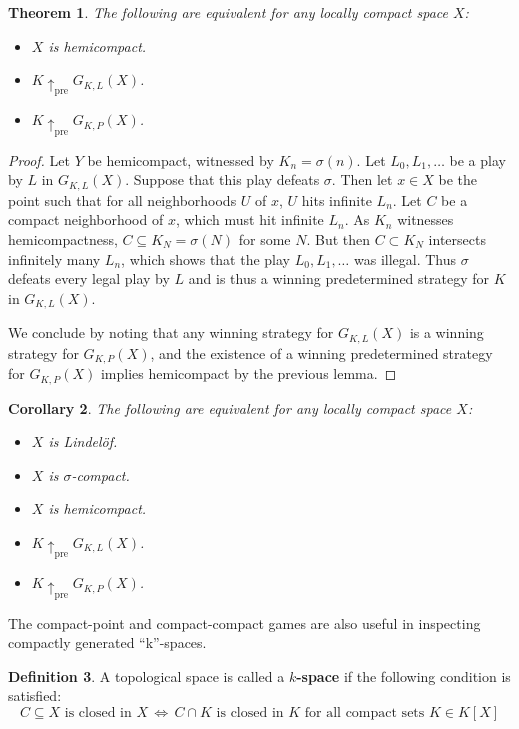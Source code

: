 \documentclass[11pt]{article}
\theoremstyle{plain}
\newtheorem{theorem}{Theorem}
\newtheorem{corollary}[theorem]{Corollary}
\theoremstyle{definition}
\newtheorem{definition}[theorem]{Definition}
\theoremstyle{remark}
\newcommand{\prewin}{\uparrow_{\text{pre}}}
\begin{document}
\begin{theorem}
The following are equivalent for any locally compact space $X$:
  \begin{itemize}
  \item $X$ is hemicompact.
  \item $K \prewin G_{K,L}(X)$.
  \item $K \prewin G_{K,P}(X)$.
  \end{itemize}
\end{theorem}

\begin{proof}
Let $Y$ be hemicompact, witnessed by $K_n=\sigma(n)$. Let $L_0,L_1,\dots$ be a play by $L$ in $G_{K,L}(X)$. Suppose that this play defeats $\sigma$. Then let $x\in X$ be the point such that for all neighborhoods $U$ of $x$, $U$ hits infinite $L_n$. Let $C$ be a compact neighborhood of $x$, which must hit infinite $L_n$. As $K_n$ witnesses hemicompactness, $C \subseteq K_N = \sigma(N)$ for some $N$. But then $C\subset K_N$ intersects infinitely many $L_n$, which shows that the play $L_0,L_1,\dots$ was illegal. Thus $\sigma$ defeats every legal play by $L$ and is thus a winning predetermined strategy for $K$ in $G_{K,L}(X)$.

We conclude by noting that any winning strategy for $G_{K,L}(X)$ is a winning strategy for $G_{K,P}(X)$, and the existence of a winning predetermined strategy for $G_{K,P}(X)$ implies hemicompact by the previous lemma.
\end{proof}

\begin{corollary}
The following are equivalent for any locally compact space $X$:
  \begin{itemize}
  \item $X$ is Lindel\"of.
  \item $X$ is $\sigma$-compact.
  \item $X$ is hemicompact.
  \item $K \prewin G_{K,L}(X)$.
  \item $K \prewin G_{K,P}(X)$.
  \end{itemize}
\end{corollary}

The compact-point and compact-compact games are also useful in inspecting compactly generated ``k''-spaces.

\begin{definition}
A topological space is called a \textbf{$k$-space} if the following condition is satisfied: \[C \subseteq X \text{ is closed in } X\, \Leftrightarrow \, C\cap K \text{ is closed in } K \text{ for all compact sets } K\in K[X]\]
\end{definition}
\end{document}
